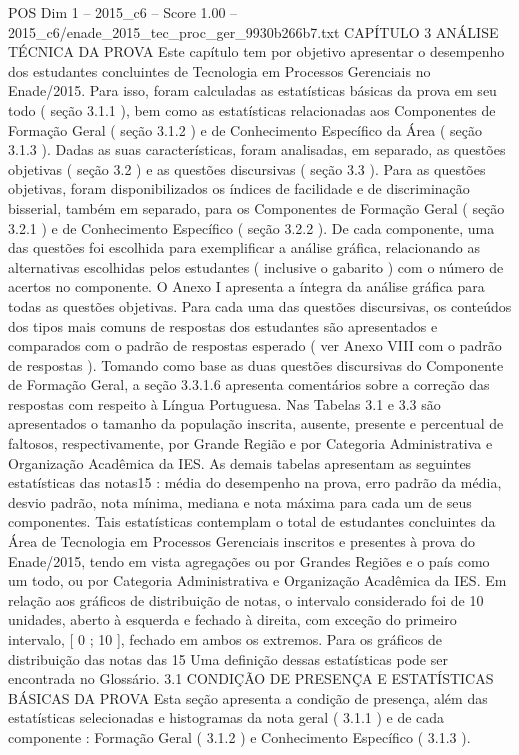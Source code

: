 \begin{textsample}{POS Dim 1 – 2015\_c6 – Score 1.00 – 2015\_c6/enade\_2015\_tec\_proc\_ger\_9930b266b7.txt}  \label{ex:f1_pos_160}
CAPÍTULO 3 ANÁLISE TÉCNICA DA PROVA Este capítulo tem por objetivo apresentar o desempenho dos estudantes concluintes de Tecnologia em Processos Gerenciais no Enade/2015.
Para isso, foram calculadas as estatísticas básicas da prova em seu todo ( seção 3.1.1 ), bem como as estatísticas relacionadas aos Componentes de Formação Geral ( seção 3.1.2 ) e de Conhecimento Específico da Área ( seção 3.1.3 ).
Dadas as suas características, foram analisadas, em separado, as questões objetivas ( seção 3.2 ) e as questões discursivas ( seção 3.3 ).
Para as questões objetivas, foram disponibilizados os índices de facilidade e de discriminação bisserial, também em separado, para os Componentes de Formação Geral ( seção 3.2.1 ) e de Conhecimento Específico ( seção 3.2.2 ).
De cada componente, uma das questões foi escolhida para exemplificar a análise gráfica, relacionando as alternativas escolhidas pelos estudantes ( inclusive o gabarito ) com o número de acertos no componente.
O Anexo I apresenta a íntegra da análise gráfica para todas as questões objetivas.
Para cada uma das questões discursivas, os conteúdos dos tipos mais comuns de respostas dos estudantes são apresentados e comparados com o padrão de respostas esperado ( ver Anexo VIII com o padrão de respostas ).
Tomando como base as duas questões discursivas do Componente de Formação Geral, a seção 3.3.1.6 apresenta comentários sobre a correção das respostas com respeito à Língua Portuguesa.
Nas Tabelas 3.1 e 3.3 são apresentados o tamanho da população inscrita, ausente, presente e percentual de faltosos, respectivamente, por Grande Região e por Categoria Administrativa e Organização Acadêmica da IES.
As demais tabelas apresentam as seguintes estatísticas das notas15 : média do desempenho na prova, erro padrão da média, desvio padrão, nota mínima, mediana e nota máxima para cada um de seus componentes.
Tais estatísticas contemplam o total de estudantes concluintes da Área de Tecnologia em Processos Gerenciais inscritos e presentes à prova do Enade/2015, tendo em vista agregações ou por Grandes Regiões e o país como um todo, ou por Categoria Administrativa e Organização Acadêmica da IES.
Em relação aos gráficos de distribuição de notas, o intervalo considerado foi de 10 unidades, aberto à esquerda e fechado à direita, com exceção do primeiro intervalo, [ 0 ; 10 ], fechado em ambos os extremos.
Para os gráficos de distribuição das notas das 15 Uma definição dessas estatísticas pode ser encontrada no Glossário. 3.1 CONDIÇÃO DE PRESENÇA E ESTATÍSTICAS BÁSICAS DA PROVA Esta seção apresenta a condição de presença, além das estatísticas selecionadas e histogramas da nota geral ( 3.1.1 ) e de cada componente : Formação Geral ( 3.1.2 ) e Conhecimento Específico ( 3.1.3 ).

\end{textsample}
